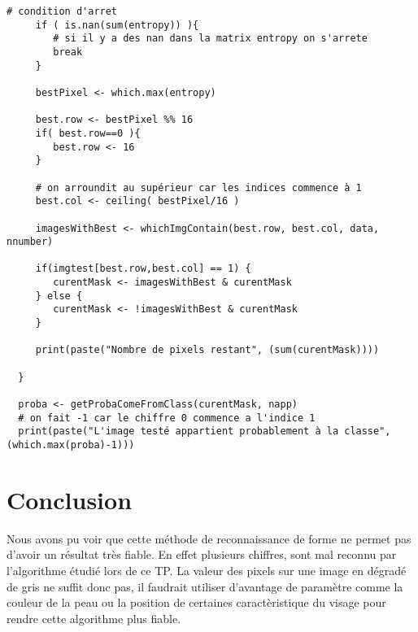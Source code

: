 \documentclass[a4paper,11pt]{article}
\begin{document}
\begin{lstlisting}[caption=Algorithme principal du TP]
     # condition d'arret
     if ( is.nan(sum(entropy)) ){
        # si il y a des nan dans la matrix entropy on s'arrete    
        break
     }

     bestPixel <- which.max(entropy)

     best.row <- bestPixel %% 16 
     if( best.row==0 ){
        best.row <- 16
     }

     # on arroundit au supérieur car les indices commence à 1
     best.col <- ceiling( bestPixel/16 )

     imagesWithBest <- whichImgContain(best.row, best.col, data, nnumber)

     if(imgtest[best.row,best.col] == 1) {
        curentMask <- imagesWithBest & curentMask
     } else {
        curentMask <- !imagesWithBest & curentMask
     }

     print(paste("Nombre de pixels restant", (sum(curentMask))))

  }

  proba <- getProbaComeFromClass(curentMask, napp)
  # on fait -1 car le chiffre 0 commence a l'indice 1
  print(paste("L'image testé appartient probablement à la classe", (which.max(proba)-1)))
  \end{lstlisting}
  
  \section*{Conclusion}
  Nous avons pu voir que cette méthode de reconnaissance de forme ne permet pas d'avoir un résultat
  très fiable. En effet plusieurs chiffres, sont mal reconnu par l'algorithme étudié lors de ce TP.
  La valeur des pixels sur une image en dégradé de gris ne suffit donc pas, il faudrait utiliser 
  d'avantage de paramètre comme la couleur de la peau ou la position de certaines caractèristique du visage
  pour rendre cette algorithme plus fiable.
  
\end{document}
